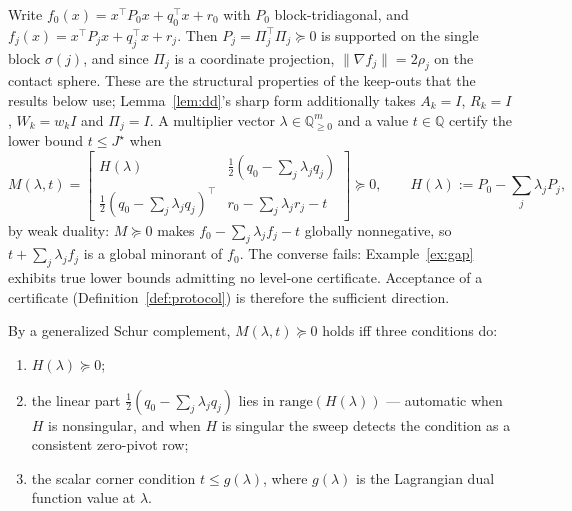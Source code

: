\documentclass[11pt]{article}
\theoremstyle{definition}
\theoremstyle{remark}
\newcommand{\Q}{\mathbb{Q}}
\renewcommand{\_}{\ifdim\fontdimen3\font=0pt\relax\char`\_\else\textunderscore\fi\hspace{0pt}}
\begin{document}
Write $f_0(x)=x^\top P_0 x+q_0^\top x+r_0$ with $P_0$ block-tridiagonal, and
$f_j(x)=x^\top P_j x+q_j^\top x+r_j$. Then $P_j=\Pi_j^\top\Pi_j\succeq0$ is
supported on the single block $\sigma(j)$, and since $\Pi_j$ is a coordinate
projection, $\lVert\nabla f_j\rVert=2\rho_j$ on the contact sphere. These are
the structural properties of the keep-outs that the results below use;
Lemma~\ref{lem:dd}'s sharp form additionally takes $A_k=I$, $R_k=I$, $W_k=w_kI$
and $\Pi_j=I$. A multiplier vector $\lambda\in\Q_{\ge0}^m$ and a value $t\in\Q$
certify the lower bound $t\le J^\star$ when
\[
M(\lambda,t)=\begin{bmatrix} H(\lambda) & \tfrac12(q_0-\textstyle\sum_j\lambda_j q_j)\\[2pt]
\tfrac12(q_0-\sum_j\lambda_j q_j)^\top & r_0-\sum_j\lambda_j r_j-t\end{bmatrix}\succeq 0,
\qquad H(\lambda):=P_0-\textstyle\sum_j\lambda_j P_j,
\]
by weak duality: $M\succeq0$ makes $f_0-\sum_j\lambda_j f_j-t$ globally
nonnegative, so $t+\sum_j\lambda_j f_j$ is a global minorant of $f_0$. The
converse fails: Example~\ref{ex:gap} exhibits true lower bounds admitting no
level-one certificate. Acceptance of a certificate
(Definition~\ref{def:protocol}) is therefore the sufficient direction.

By a generalized Schur complement, $M(\lambda,t)\succeq0$ holds iff three
conditions do:
\begin{enumerate}
\item[(i)] $H(\lambda)\succeq0$;
\item[(ii)] the linear part $\tfrac12(q_0-\sum_j\lambda_j q_j)$ lies in
$\mathrm{range}(H(\lambda))$ --- automatic when $H$ is nonsingular, and when
$H$ is singular the sweep detects the condition as a consistent zero-pivot
row;
\item[(iii)] the scalar corner condition $t\le g(\lambda)$, where $g(\lambda)$
is the Lagrangian dual function value at $\lambda$.
\end{enumerate}
\end{document}
